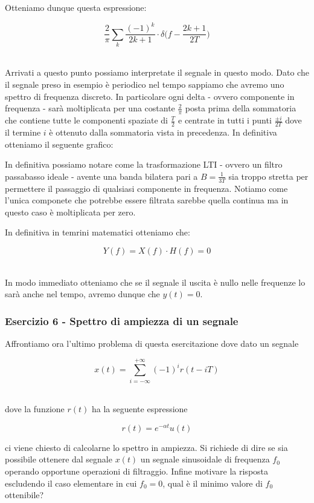 \documentclass[../main.tex]{subfiles}
\begin{document}
Otteniamo dunque questa espressione:

\[ \frac{2}{\pi} \sum_k  \frac{(-1)^k}{2k + 1} \cdot \delta\bigg( f - \frac{2k+1}{2T} \bigg)  \]\

Arrivati a questo punto possiamo interpretate il segnale in questo modo.
Dato che il segnale preso in esempio è periodico nel tempo sappiamo che avremo uno spettro di frequenza discreto. In particolare ogni delta - ovvero componente in frequenza - sarà moltiplicata per una costante $\tfrac{2}{\pi}$ posta prima della sommatoria che contiene tutte le componenti spaziate di $\tfrac{T}{2}$ e centrate in tutti i punti $\tfrac{\pm i}{2T}$ dove il termine $i$ è ottenuto dalla sommatoria vista in precedenza. 
In definitiva otteniamo il seguente grafico:


In definitiva possiamo notare come la trasformazione LTI - ovvero un filtro passabasso ideale - avente una banda bilatera pari a $B = \tfrac{1}{3T}$ sia troppo stretta per permettere il passaggio di qualsiasi componente in frequenza. Notiamo come l'unica componete che potrebbe essere filtrata sarebbe quella continua ma in questo caso è moltiplicata per zero.

In definitiva in temrini matematici otteniamo che:

\[Y(f) = X(f) \cdot H(f) = 0 \]\

In modo immediato otteniamo che se il segnale il uscita è nullo nelle frequenze lo sarà anche nel tempo, avremo dunque che $y(t) = 0$.
  

\subsubsection{Esercizio 6 - Spettro di ampiezza di un segnale}

Affrontiamo ora l'ultimo problema di questa esercitazione dove dato un segnale

\[x(t) = \sum_{i = -\infty}^{+\infty} (-1)^i r(t - iT) \]\


dove la funzione $r(t)$ ha la seguente espressione

\[r(t) = e^{-\alpha t}u(t) \]

ci viene chiesto di calcolarne lo spettro in ampiezza. Si richiede di dire se sia possibile ottenere dal segnale $x(t)$ un segnale sinusoidale di frequenza $f_0$ operando opportune operazioni di filtraggio.
Infine motivare la risposta escludendo il caso elementare in cui $f_0 = 0$, qual è il minimo valore di $f_0$ ottenibile?\\
\end{document}
